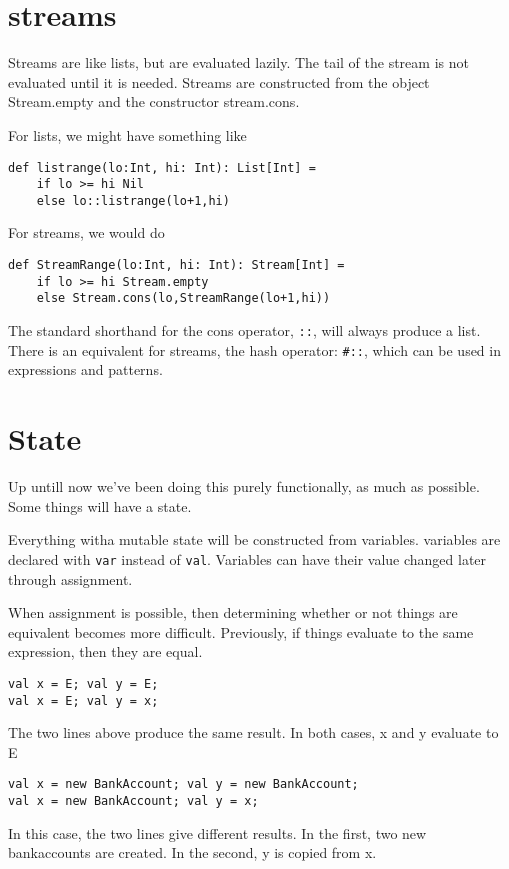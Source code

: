 \section{streams}

Streams are like lists, but are evaluated lazily. The tail of the stream is not evaluated until it is needed. Streams are constructed from the object Stream.empty and the constructor stream.cons.

For lists, we might have something like
\begin{lstlisting}
def listrange(lo:Int, hi: Int): List[Int] = 
	if lo >= hi Nil
	else lo::listrange(lo+1,hi)
\end{lstlisting}
For streams, we would do
\begin{lstlisting}
def StreamRange(lo:Int, hi: Int): Stream[Int] = 
	if lo >= hi Stream.empty
	else Stream.cons(lo,StreamRange(lo+1,hi))
\end{lstlisting}

The standard shorthand for the cons operator, \lstinline|::|, will always produce a list. There is an equivalent for streams, the hash operator: \lstinline|#::|, which can be used in expressions and patterns. 

\section{State}
Up untill now we've been doing this purely functionally, as much as possible.
Some things will have a state. 

Everything witha mutable state will be constructed from variables. variables are declared with \lstinline|var| instead of \lstinline|val|. Variables can have their value changed later through assignment.

When assignment is possible, then determining whether or not things are equivalent becomes more difficult. Previously, if things evaluate to the same expression, then they are equal. 

\begin{lstlisting}
val x = E; val y = E;
val x = E; val y = x;
\end{lstlisting}
The two lines above produce the same result. In both cases, x and y evaluate to E
\begin{lstlisting}
val x = new BankAccount; val y = new BankAccount;
val x = new BankAccount; val y = x;
\end{lstlisting}
In this case, the two lines give different results. In the first, two new bankaccounts are created. In the second, y is copied from x.


